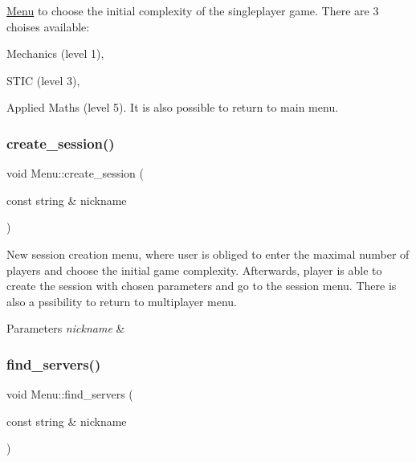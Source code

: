 \hyperlink{classMenu}{Menu} to choose the initial complexity of the singleplayer game. There are 3 choises available\+: 


\begin{DoxyItemize}
\item Mechanics (level 1),
\item S\+T\+IC (level 3),
\item Applied Maths (level 5). It is also possible to return to main menu. 
\end{DoxyItemize}\mbox{\label{classMenu_a14fd150a078fc9d28c681e81a4367e86}} 
\subsubsection{\texorpdfstring{create\+\_\+session()}{create\_session()}}
{\footnotesize\ttfamily void Menu\+::create\+\_\+session (\begin{DoxyParamCaption}\item[{const string \&}]{nickname }\end{DoxyParamCaption})}



New session creation menu, where user is obliged to enter the maximal number of players and choose the initial game complexity. Afterwards, player is able to create the session with chosen parameters and go to the session menu. There is also a pssibility to return to multiplayer menu. 


\begin{DoxyParams}{Parameters}
{\em nickname} & \\
\hline
\end{DoxyParams}
\mbox{\label{classMenu_ab31ffa63ae89778ddb474d107d2de437}} 
\subsubsection{\texorpdfstring{find\+\_\+servers()}{find\_servers()}}
{\footnotesize\ttfamily void Menu\+::find\+\_\+servers (\begin{DoxyParamCaption}\item[{const string \&}]{nickname }\end{DoxyParamCaption})}



